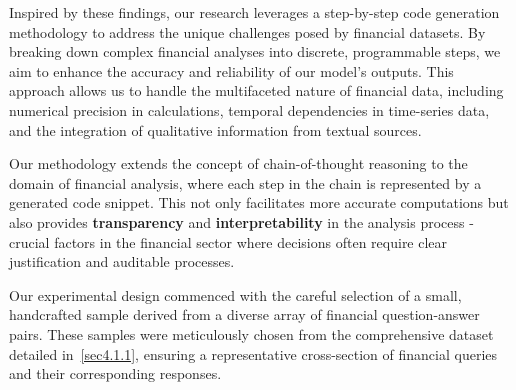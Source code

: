 \documentclass[logo,msc]{infthesis}           %
\begin{document}
Inspired by these findings, our research leverages a step-by-step code generation methodology to address the unique challenges posed by financial datasets. By breaking down complex financial analyses into discrete, programmable steps, we aim to enhance the accuracy and reliability of our model's outputs. This approach allows us to handle the multifaceted nature of financial data, including numerical precision in calculations, temporal dependencies in time-series data, and the integration of qualitative information from textual sources.

Our methodology extends the concept of chain-of-thought reasoning to the domain of financial analysis, where each step in the chain is represented by a generated code snippet. This not only facilitates more accurate computations but also provides \textbf{transparency} and \textbf{interpretability} in the analysis process - crucial factors in the financial sector where decisions often require clear justification and auditable processes.

Our experimental design commenced with the careful selection of a small, handcrafted sample derived from a diverse array of financial question-answer pairs. These samples were meticulously chosen from the comprehensive dataset detailed in~\ref{sec4.1.1}, ensuring a representative cross-section of financial queries and their corresponding responses.
\end{document}
